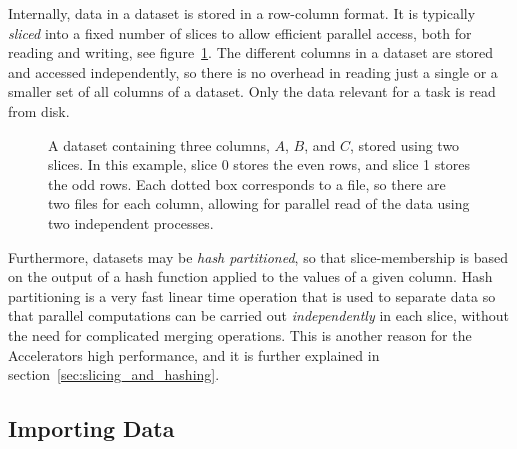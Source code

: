 Internally, data in a dataset is stored in a row-column format.  It is
typically \emph{sliced} into a fixed number of slices to allow
efficient parallel access, both for reading and writing, see
figure~\ref{fig:dataset}. The different columns in a dataset are
stored and accessed independently, so there is no overhead in reading
just a single or a smaller set of all columns of a dataset.  Only the
data relevant for a task is read from disk.

\begin{figure}[h!]
  \begin{center}
    
    \caption{A dataset containing three columns, $A$, $B$, and $C$,
      stored using two slices.  In this example, slice 0 stores the
      even rows, and slice 1 stores the odd rows.  Each dotted box
      corresponds to a file, so there are two files for each column,
      allowing for parallel read of the data using two independent
      processes.}
    \label{fig:dataset}
  \end{center}
\end{figure}

Furthermore, datasets may be \textsl{hash partitioned}, so that
slice-membership is based on the output of a hash function applied to
the values of a given column.  Hash partitioning is a very fast linear
time operation that is used to separate data so that parallel
computations can be carried out \emph{independently} in each slice,
without the need for complicated merging operations.  This is another
reason for the Accelerators high performance, and it is further
explained in section~\ref{sec:slicing_and_hashing}.



\subsection{Importing Data}

